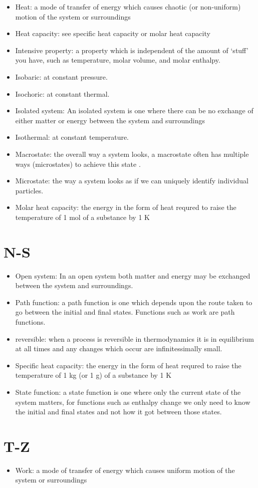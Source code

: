 \documentclass[
]{book}
\providecommand{\tightlist}{%
  \setlength{\itemsep}{0pt}\setlength{\parskip}{0pt}}
\begin{document}
\begin{itemize}
\item
  Heat: a mode of transfer of energy which causes chaotic (or non-uniform) motion of the system or surroundings
\item
  Heat capacity: see specific heat capacity or molar heat capacity
\item
  Intensive property: a property which is independent of the amount of `stuff' you have, such as temperature, molar volume, and molar enthalpy.
\item
  Isobaric: at constant pressure.
\item
  Isochoric: at constant thermal.
\item
  Isolated system: An isolated system is one where there can be no exchange of either matter or energy between the system and surroundings
\item
  Isothermal: at constant temperature.
\item
  Macrostate: the overall way a system looks, a macrostate often has multiple ways (microstates) to achieve this state .
\item
  Microstate: the way a system looks as if we can uniquely identify individual particles.
\item
  Molar heat capacity: the energy in the form of heat requred to raise the temperature of 1 mol of a substance by 1 K
\end{itemize}

\hypertarget{n-s}{%
\section*{N-S}\label{n-s}}

\begin{itemize}
\item
  Open system: In an open system both matter and energy may be exchanged between the system and surroundings.
\item
  Path function: a path function is one which depends upon the route taken to go between the initial and final states. Functions such as work are path functions.
\item
  reversible: when a process is reversible in thermodynamics it is in equilibrium at all times and any changes which occur are infinitessimally small.
\item
  Specific heat capacity: the energy in the form of heat requred to raise the temperature of 1 kg (or 1 g) of a substance by 1 K
\item
  State function: a state function is one where only the current state of the system matters, for functions such as enthalpy change we only need to know the initial and final states and not how it got between those states.
\end{itemize}

\hypertarget{t-z}{%
\section*{T-Z}\label{t-z}}

\begin{itemize}
\tightlist
\item
  Work: a mode of transfer of energy which causes uniform motion of the system or surroundings
\end{itemize}

  
\end{document}
